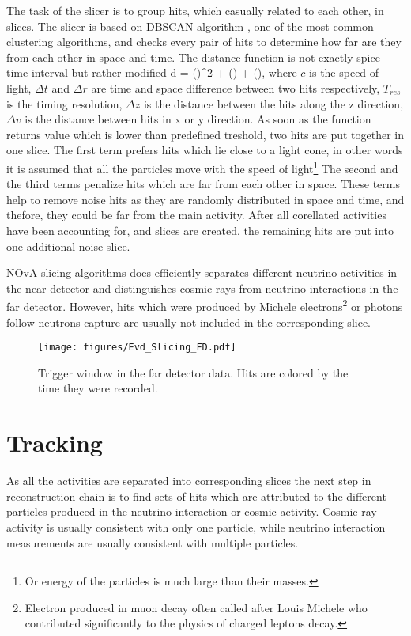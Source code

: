 The task of the slicer is to group hits, which casually related to each other, in slices. The slicer 
is based on DBSCAN algorithm \cite{DBSCAN}, one of the most common clustering algorithms, and checks 
every pair of hits to determine how far are they from each other in space and time. The distance 
function is not exactly spice-time interval but rather modified 
\be
d = \Big(\Big)^2 + \Big(\Big) + 
\Big(\Big),
\ee 
where $c$ is the speed of light, $\Delta t$ and $\Delta r$ are time and space difference between two 
hits respectively, $T_{res}$ is the timing resolution, $\Delta z$ is the distance between the hits
along the z direction, $\Delta v$ is the distance between hits in x or y direction. As soon as the 
function returns value which is lower than predefined treshold, two hits are put together in one slice.
The first term prefers hits which lie close to a light cone, in other words it is assumed that all
the particles move with the speed of light\footnote{Or energy of the particles is much large than their 
masses.} The second and the third terms penalize hits which are far from each other in space. These
terms help to remove noise hits as they are randomly distributed in space and time, and thefore, they 
could be far from the main activity. After all corellated activities have been accounting for, and 
slices are created, the remaining hits are put into one additional noise slice.

NOvA slicing algorithms does efficiently separates different neutrino activities in the near detector
and distinguishes cosmic rays from neutrino interactions in the far detector. However, hits which were produced
by Michele electrons\footnote{Electron produced in muon decay often called after Louis Michele who
contributed significantly to the physics of charged leptons decay.} or photons follow neutrons capture are
usually not included in the corresponding slice.
\begin{figure}[t]
\texttt{[image: figures/Evd\_Slicing\_FD.pdf]}
\centering
\caption{Trigger window in the far detector data. Hits are colored by the time they were recorded.} 
\label{fig:EVD_full}
\end{figure}

\section{Tracking}
As all the activities are separated into corresponding slices the next step in reconstruction chain is 
to find sets of hits which are attributed to the different particles produced in the neutrino interaction 
or cosmic activity. Cosmic ray activity is usually consistent with only one particle, while neutrino 
interaction measurements are usually consistent with multiple particles.

